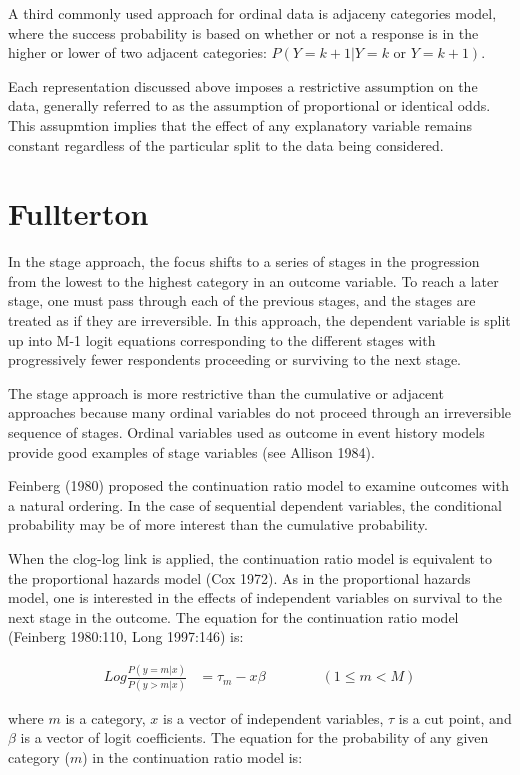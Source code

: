 A third commonly used approach for ordinal data is adjaceny categories model, where the success probability is based on whether or not a response is in the higher or lower of two adjacent categories: $P(Y=k+1 | Y=k \text{ or } Y=k+1)$.

Each representation discussed above imposes a restrictive assumption on the data, generally referred to as the assumption of proportional or identical odds. This assupmtion implies that the effect of any explanatory variable remains constant regardless of the particular split to the data being considered.

\section{Fullterton}

In the stage approach, the focus shifts to a series of stages in the progression from the lowest to the highest category in an outcome variable. To reach a later stage, one must pass through each of the previous stages, and the stages are treated as if they are irreversible. In this approach, the dependent variable is split up into M-1 logit equations corresponding to the different stages with progressively fewer respondents proceeding or surviving to the next stage.

The stage approach is more restrictive than the cumulative or adjacent approaches because many ordinal variables do not proceed through an irreversible sequence of stages. Ordinal variables used as outcome in event history models provide good examples of stage variables (see Allison 1984).

Feinberg (1980) proposed the continuation ratio model to examine outcomes with a natural ordering. In the case of sequential dependent variables, the conditional probability may be of more interest than the cumulative probability.

When the clog-log link is applied, the continuation ratio model is equivalent to the proportional hazards model (Cox 1972). As in the proportional hazards model, one is interested in the effects of independent variables on survival to the next stage in the outcome. The equation for the continuation ratio model (Feinberg 1980:110, Long 1997:146) is:

\begin{align*}
Log \frac{P(y=m|x)}{P(y>m|x)} &= \tau_{m} - x\beta \qquad\qquad (1 \leq m < M)
\end{align*}

where $m$ is a category, $x$ is a vector of independent variables, $\tau$ is a cut point, and $\beta$ is a vector of logit coefficients. The equation for the probability of any given category ($m$) in the continuation ratio model is:

